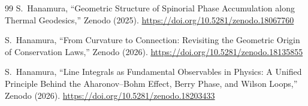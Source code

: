\documentclass[12pt,letterpaper]{article}
\begin{document}
\begin{thebibliography}{99}
S.~Hanamura, ``Geometric Structure of Spinorial Phase Accumulation along Thermal Geodesics,'' Zenodo (2025).
\href{https://doi.org/10.5281/zenodo.18067760}{https://doi.org/10.5281/zenodo.18067760}

S.~Hanamura, ``From Curvature to Connection: Revisiting the Geometric Origin of Conservation Laws,'' Zenodo (2026).
\href{https://doi.org/10.5281/zenodo.18135855}{https://doi.org/10.5281/zenodo.18135855}

S.~Hanamura, ``Line Integrals as Fundamental Observables in Physics: A Unified Principle Behind the Aharonov--Bohm Effect, Berry Phase, and Wilson Loops,'' Zenodo (2026).
\href{https://doi.org/10.5281/zenodo.18203433}{https://doi.org/10.5281/zenodo.18203433}

\end{thebibliography}

\end{document}
